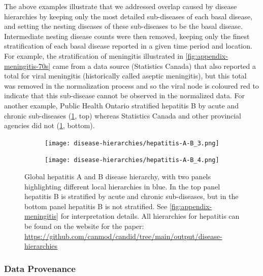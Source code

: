 \documentclass[12pt]{article}
\begin{document}
The above examples illustrate that we addressed overlap caused by disease hierarchies by keeping only the most detailed sub-diseases of each basal disease, and setting the nesting diseases of these sub-diseases to be the basal disease. Intermediate nesting disease counts were then removed, keeping only the finest stratification of each basal disease reported in a given time period and location. For example, the stratification of meningitis illustrated in \cref{fig:appendix-meningitis-70s} came from a data source (Statistics Canada) that also reported a total for viral meningitis (historically called aseptic meningitis), but this total was removed in the normalization process and so the viral node is coloured red to indicate that this sub-disease cannot be observed in the normalized data. For another example, Public Health Ontario stratified hepatitis B by acute and chronic sub-diseases (\cref{fig:appendix-hep}, top) whereas Statistics Canada and other provincial agencies did not (\cref{fig:appendix-hep}, bottom).

\begin{figure}
  \begin{subfigure}{1\textwidth}  
  \texttt{[image: disease-hierarchies/hepatitis-A-B\_3.png]}
\end{subfigure}
\begin{subfigure}{1\textwidth}
  \texttt{[image: disease-hierarchies/hepatitis-A-B\_4.png]}
\end{subfigure}
\caption{Global hepatitis A and B disease hierarchy, with two panels highlighting different local hierarchies in blue. In the top panel hepatitis B is stratified by acute and chronic sub-diseases, but in the bottom panel hepatitis B is not stratified. See \cref{fig:appendix-meningitis} for interpretation details. All hierarchies for hepatitis can be found on the website for the paper: \url{https://github.com/canmod/candid/tree/main/output/disease-hierarchies}}\label{fig:appendix-hep}
\end{figure}

\FloatBarrier

\subsubsection{Data Provenance}\label{sec:appendix-provenance}
\end{document}
